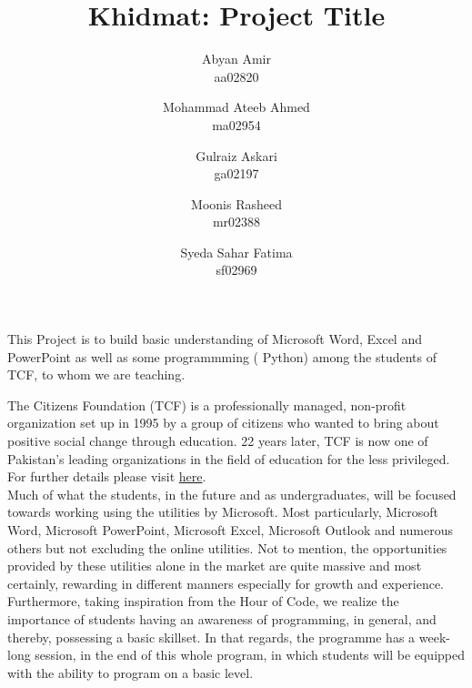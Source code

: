 \documentclass{article}
\title {Khidmat: Project Title}
\author{
  Abyan Amir\\ aa02820
  \and
  Mohammad Ateeb Ahmed\\ ma02954
  \and
  Gulraiz Askari\\ ga02197
  \and
  Moonis Rasheed\\ mr02388
  \and
  Syeda Sahar Fatima\\ sf02969
}
\date{}
\begin{document}
\maketitle



This Project is to build basic understanding of Microsoft Word, Excel and PowerPoint as well as some programmming ( Python) among the students of TCF, to whom we are teaching.

The Citizens Foundation (TCF) is a professionally managed, non-profit organization set up in 1995 by a group of citizens who wanted to bring about positive social change through education. 22 years later, TCF is now one of Pakistan’s leading organizations in the field of education for the less privileged. For further details please visit     \href{https://www.tcf.org.pk/#about
}{here}.
\\

Much of what the students, in the future and as undergraduates, will be focused towards working using the utilities by Microsoft. Most particularly, Microsoft Word, Microsoft PowerPoint, Microsoft Excel, Microsoft Outlook and numerous others but not excluding the online utilities. Not to mention, the opportunities provided by these utilities alone in the market are quite massive and most certainly, rewarding in different manners especially for growth and experience.\\
Furthermore, taking inspiration from the Hour of Code, we realize the importance of students having an awareness of programming, in general, and thereby, possessing a basic skillset. In that regards, the programme has a week-long session, in the end of this whole program, in which students will be equipped with the ability to program on a basic level.  \\
\end{document}
